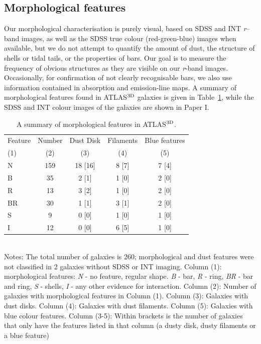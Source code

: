 \documentclass[usenatbib,usegraphicx]{mn2e}
\begin{document}
\subsection{Morphological features}
\label{ss:morph}

Our morphological characterisation is purely visual, based on SDSS and INT {\it r}--band images, as well as the SDSS true colour (red-green-blue) images \citep{2004PASP..116..133L} when available, but we do not attempt to quantify the amount of dust, the structure of shells or tidal tails, or the properties of bars. Our goal is to measure the frequency of obvious structures as they are visible on our {\it r}-band images. Occasionally, for confirmation of not clearly recognisable bars, we also use information contained in absorption and emission-line maps. A summary of morphological features found in ATLAS$^{\rm 3D}$ galaxies is given in Table~\ref{t:morph}, while the SDSS and INT colour images of the galaxies are shown in Paper I.  

\begin{table}
\caption{A summary of morphological features in ATLAS$^{\rm 3D}$. }
\label{t:morph}%
\begin{tabular}{lcccc}
\hline
Feature & Number& Dust Disk& Filaments& Blue features\\
(1)& (2)&(3) &(4) &(5)\\
\hline
N               &159  &18 [16] & 8 [7]    &7 [4]\\
B               & 35   &2 [1] &  1  [0]   &2 [0]\\
R               & 13   & 3 [2] &  1 [0]   &2 [0]\\
BR            & 30   &1 [1]     &  3 [1]       &2 [0]\\
S                &9      &0 [0]    &  1 [0]     &1 [0]\\
I                 &12     &0 [0]     &  6 [5]      &1 [0]\\
\hline
\end{tabular}
\\
Notes: The total number of galaxies is 260; morphological and dust features were not classified in 2 galaxies without SDSS or INT imaging. 
Column (1): morphological features: {\it N} - no feature, regular shape. {\it B} - bar, {\it R} - ring,  {\it BR} - bar and ring,   {\it S} - shells, {\it I} - any other evidence for interaction.
Column (2): Number of galaxies with morphological features in Column (1).
Column (3): Galaxies with dust disks.
Column (4): Galaxies with dust filaments. 
Column (5): Galaxies with blue colour features.
Column (3-5): Within brackets is the number of galaxies that only have the features listed in that column (a dusty disk, dusty filaments or a blue feature)
\end{table}
\end{document}
